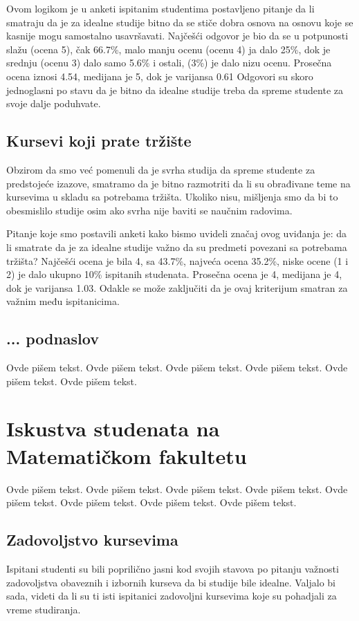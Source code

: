 \documentclass[a4paper]{article}
\begin{document}
Ovom logikom je u anketi ispitanim studentima postavljeno pitanje da li smatraju da je za idealne studije bitno da se stiče dobra osnova na osnovu koje se kasnije mogu samostalno usavršavati. Najčešći odgovor je bio da se u potpunosti slažu (ocena 5), čak 66.7\%, malo manju ocenu (ocenu 4) ja dalo 25\%, dok je srednju (ocenu 3) dalo samo 5.6\% i ostali, (3\%) je dalo nizu ocenu. Prosečna ocena iznosi 4.54, medijana je 5, dok je varijansa 0.61 Odgovori su skoro jednoglasni po stavu da je bitno da idealne studije treba da spreme studente za svoje dalje poduhvate. 

\subsection{Kursevi koji prate tržište}
\label{subsec:tržište}
Obzirom da smo već pomenuli da je svrha studija da spreme studente za predstojeće izazove, smatramo da je bitno razmotriti da li su obrađivane teme na kursevima u skladu sa potrebama tržišta. Ukoliko nisu, mišljenja smo da bi to obesmislilo studije osim ako svrha nije baviti se naučnim radovima.

Pitanje koje smo postavili anketi kako bismo uvideli značaj ovog uviđanja je: da li smatrate da je za idealne studije važno da su predmeti povezani sa potrebama tržišta? Najčešći ocena je bila 4, sa 43.7\%, najveća ocena 35.2\%, niske ocene (1 i 2) je dalo ukupno 10\% ispitanih studenata. Prosečna ocena je 4, medijana je 4, dok je varijansa 1.03. Odakle se može zaključiti da je ovaj kriterijum smatran za važnim među ispitanicima.


\subsection{... podnaslov}
\label{subsec:podnaslovN}

Ovde pišem tekst. 
Ovde pišem tekst. 
Ovde pišem tekst. 
Ovde pišem tekst. 
Ovde pišem tekst. 
Ovde pišem tekst. 


\section{Iskustva studenata na Matematičkom fakultetu}

Ovde pišem tekst. 
Ovde pišem tekst. 
Ovde pišem tekst. 
Ovde pišem tekst. 
Ovde pišem tekst. 
Ovde pišem tekst. 
Ovde pišem tekst. 
Ovde pišem tekst.

\subsection{Zadovoljstvo kursevima}
Ispitani studenti su bili poprilično jasni kod svojih stavova po pitanju važnosti zadovoljstva obaveznih i izbornih kurseva da bi studije bile idealne. Valjalo bi sada, videti da li su ti isti ispitanici zadovoljni kursevima koje su pohadjali za vreme studiranja.
\end{document}

